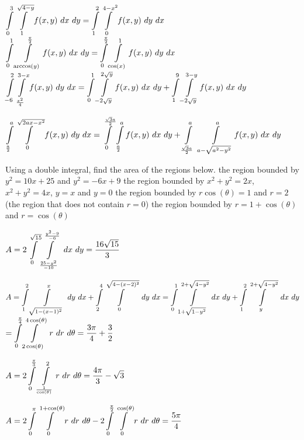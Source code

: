 \begin{Answer}
    
         \Question $\displaystyle \int\limits_{0}^3\int\limits_{1}^{\sqrt{4-y}} f(x,y)\ dx\ dy = \displaystyle \int\limits_{1}^2\int\limits_{0}^{4-x^2} f(x,y)\ dy\ dx$
         \Question $\ds \int\limits_{0}^1\int\limits_{\arccos(y)}^{\frac{\pi}{2}} f(x,y)\ dx\ dy = \ds \int\limits_{0}^{\frac{\pi}{2}}\int\limits_{\cos(x)}^{1} f(x,y)\ dy\ dx$
         \Question $\ds \int\limits_{-6}^2\int\limits_{\frac{x^2}{4}}^{3-x} f(x,y)\ dy\ dx = \ds \int\limits_{0}^1\int\limits_{-2\sqrt{y}}^{2\sqrt{y}} f(x,y)\ dx\ dy + \ds \int\limits_{1}^9\int\limits_{-2\sqrt{y}}^{3-y} f(x,y)\ dx\ dy$
         
         \Question $\displaystyle\int\limits_{\frac{a}{2}}^{a}\int\limits_{0}^{\sqrt{2ax-x^2}} f(x,y)\ dy\ dx = \displaystyle\int\limits_0^{\frac{\sqrt{3}a}{2}} \displaystyle \int\limits_{\frac{a}{2}}^{a} f(x,y) \ dx \ dy + \displaystyle \int\limits_{\frac{\sqrt{3}a}{2}}^{a} \ \displaystyle \int\limits_{a-\sqrt{a^2-y^2}}^{a} f(x,y) \ dx \ dy$ 
    
\end{Answer}

\begin{Exercise} Using a double integral, find the area of the regions below.
        \Question[difficulty = 1] the region bounded by $y^2=10x+25$ and $y^2 = -6x+9$
        \Question[difficulty = 3] the region bounded by $x^2+y^2=2x$, $x^2+y^2 = 4x$, $y=x$ and $y=0$
        \Question[difficulty = 2] the region bounded by $r\cos (\theta) = 1$ and $r=2$ (the region that does not contain $r = 0$)
        \Question[difficulty = 3] the region bounded by $r= 1 +\cos (\theta)$ and $r=\cos (\theta)$ 
\end{Exercise}

\begin{Answer}
    
        \Question 
        $A = 2 \displaystyle \int\limits_{0}^{\sqrt{15}}\int\limits_{\frac{25-y^2}{-10}}^{\frac{y^2-9}{-6}} \ dx\ dy = \dfrac{16 \sqrt{15}}{3}$
    
        \Question 
        $A = \ds \int\limits_{1}^{2}\int\limits_{\sqrt{1-(x-1)^2}}^{x} \ dy\ dx + \ds \int\limits_{2}^{4}\int\limits_{0}^{\sqrt{4-(x-2)^2}} \ dy\ dx = 
        \ds \int\limits_{0}^{1}\int\limits_{1+\sqrt{1-y^2}}^{2+\sqrt{4-y^2}} \ dx\ dy + \ds \int\limits_{1}^{2}\int\limits_{y}^{2+\sqrt{4-y^2}} \ dx\ dy $ \\[0.2cm]
        $= \displaystyle \int \limits_0^{\frac{\pi}{4}} \int\limits_{2 \cos(\theta)}^{4\cos(\theta)} \ r \ dr \ d\theta= \dfrac{3 \pi }{4} + \dfrac{3}{2} $
        
        \Question 
         $A = 2 \displaystyle \int\limits_{0}^{\frac{\pi}{3}}\int\limits_{\frac{1}{\cos (\theta)}}^{2} r\ dr\ d\theta = \dfrac{4 \pi }{3} - \sqrt{3}$
        
        \Question 
         $A = 2 \ds \int\limits_{0}^{\pi}\int\limits_{0}^{1 + \cos(\theta)} r\ dr\ d\theta - 2 \ds \int\limits_{0}^{\frac{\pi}{2}}\int\limits_{0}^{\cos(\theta)} r\ dr\ d\theta = \dfrac{5 \pi }{4}$
         
    
\end{Answer}

